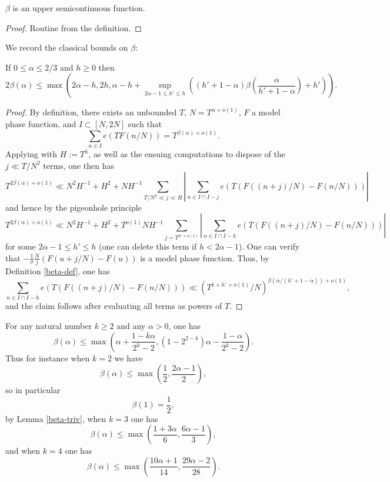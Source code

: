 \begin{lemma}\label{beta-semicts} $\beta$ is an upper semicontinuous function.
\end{lemma}

\begin{proof} Routine from the definition.
\end{proof}

We record the classical bounds on $\beta$:

\begin{lemma}\label{vdca-beta} If $0 \leq \alpha \leq 2/3$ and $h \geq 0$ then
$$ 2\beta(\alpha) \leq \max\left( 2\alpha - h, 2h, \alpha - h + \sup_{2\alpha-1 \leq h' \leq h} \left((h'+1-\alpha)\beta\left(\frac{\alpha}{h'+1-\alpha}\right)+h'\right)\right).$$
\end{lemma}

\begin{proof}  By definition, there exists an unbounded $T$, $N = T^{\alpha+o(1)}$, $F$ a model phase function, and $I \subset [N,2N]$ such that
    $$ \sum_{n \in I} e(T F(n/N)) = T^{\beta(\alpha)+o(1)}.$$
Applying \cite[(2.54)]{ivic} with $H := T^h$, as well as the ensuing computations to dispose of the $j \ll T/N^2$ terms, one then has
$$ T^{2\beta(\alpha)+o(1)} \ll N^2 H^{-1} + H^2 + N H^{-1} \sum_{T/N^2 \ll j \ll H} |\sum_{n \in I \cap I-j} e(T (F((n+j)/N) - F(n/N)))|$$
and hence by the pigeonhole principle
$$ T^{2\beta(\alpha)+o(1)} \ll N^2 H^{-1} + H^2 + T^{o(1)} N H^{-1} \sum_{j = T^{h'+o(1)}} |\sum_{n \in I \cap I-h} e(T (F((n+j)/N) - F(n/N)))|$$
for some $2\alpha-1 \leq h' \leq h$ (one can delete this term if $h < 2\alpha-1$).  One can verify that $-\frac{1}{\sigma} \frac{N}{j} (F(u+j/N)-F(u))$ is a model phase function.  Thus, by Definition \ref{beta-def}, one has
$$ \sum_{n \in I \cap I-h} e(T (F((n+j)/N) - F(n/N))) \ll (T^{1+h'+o(1)}/N)^{\beta(\alpha/(h'+1-\alpha))+o(1)},$$
and the claim follows after evaluating all terms as powers of $T$.
\end{proof}


\begin{proposition}\label{beta-vdc} For any natural number $k \geq 2$ and any $\alpha>0$, one has
    $$ \beta(\alpha) \leq \max\left( \alpha + \frac{1-k\alpha}{2^k-2}, (1 - 2^{2-k})\alpha - \frac{1-\alpha}{2^k-2}\right).$$
    Thus for instance when $k=2$ we have
    $$ \beta(\alpha) \leq \max\left( \frac{1}{2}, \frac{2\alpha-1}{2} \right),$$
    so in particular
    \begin{equation}\label{beta-1}
        \beta(1)= \frac{1}{2},
    \end{equation}
        by Lemma \ref{beta-triv},
    when $k=3$ one has
    $$ \beta(\alpha) \leq \max\left( \frac{1+3\alpha}{6}, \frac{6\alpha-1}{3} \right),$$
    and when $k=4$ one has
    $$ \beta(\alpha) \leq \max\left( \frac{10\alpha+1}{14}, \frac{29\alpha-2}{28} \right).$$
\end{proposition}

